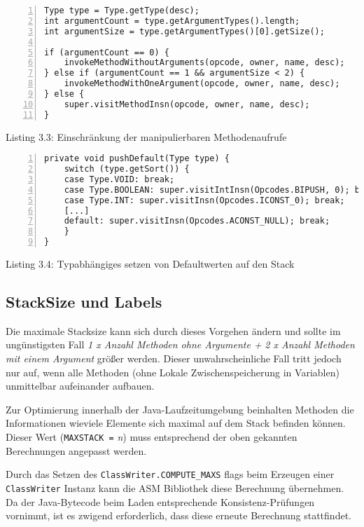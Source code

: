 \begin{lstlisting}[basicstyle=\ttfamily,numbers=left,numberstyle=\footnotesize\ttfamily,backgroundcolor=\color{source}]
Type type = Type.getType(desc);
int argumentCount = type.getArgumentTypes().length;
int argumentSize = type.getArgumentTypes()[0].getSize();

if (argumentCount == 0) {
	invokeMethodWithoutArguments(opcode, owner, name, desc);
} else if (argumentCount == 1 && argumentSize < 2) {
	invokeMethodWithOneArgument(opcode, owner, name, desc);
} else {
	super.visitMethodInsn(opcode, owner, name, desc);
}
\end{lstlisting}
\centerline{Listing 3.3: Einschränkung der manipulierbaren Methodenaufrufe}

\vspace{0.3cm}


\begin{lstlisting}[basicstyle=\ttfamily,numbers=left,numberstyle=\footnotesize\ttfamily,backgroundcolor=\color{source}]
private void pushDefault(Type type) {
	switch (type.getSort()) {
	case Type.VOID: break;
	case Type.BOOLEAN: super.visitIntInsn(Opcodes.BIPUSH, 0); break;
	case Type.INT: super.visitInsn(Opcodes.ICONST_0); break;
	[...]
	default: super.visitInsn(Opcodes.ACONST_NULL); break;
	}
}
\end{lstlisting}
\centerline{Listing 3.4: Typabhängiges setzen von Defaultwerten auf den Stack}

\vspace{0.3cm}


\subsection{StackSize und Labels}

Die maximale Stacksize kann sich durch dieses Vorgehen ändern und sollte
im ungünstigsten Fall \emph{1 x Anzahl Methoden ohne Argumente +}
\emph{2 x Anzahl Methoden mit einem Argument} größer werden.
Dieser unwahrscheinliche Fall tritt jedoch nur auf, wenn alle Methoden
(ohne Lokale Zwischenspeicherung in Variablen) unmittelbar aufeinander aufbauen.

Zur Optimierung innerhalb der Java-Laufzeitumgebung beinhalten Methoden
die Informationen wieviele Elemente sich maximal auf dem Stack befinden können.
Dieser Wert (\texttt{MAXSTACK =} \emph{n}) muss entsprechend der oben
gekannten Berechnungen angepasst werden.

Durch das Setzen des \texttt{ClassWriter.COMPUTE\_MAXS} flags beim Erzeugen
einer \texttt{ClassWriter} Instanz kann die ASM Bibliothek diese Berechnung
übernehmen. Da der Java-Bytecode beim Laden entsprechende Konsistenz-Prüfungen 
vornimmt, ist es zwigend erforderlich, dass diese erneute Berechnung stattfindet.


